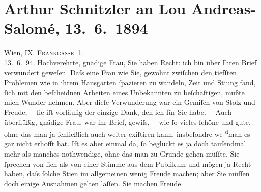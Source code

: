 

         
         \renewcommand{\erwaehntePersonen}{Personen: Lou Andreas-Salomé, Georg Brandes, Paul Goldmann}
         \renewcommand{\erwaehnteOrte}{Orte: Frankgasse 1, Paris, Wien}
         \renewcommand{\erwaehnteWerke}{Werke: Anatol, Das Märchen. Schauspiel in drei Aufzügen}
               \section[Arthur Schnitzler an Lou Andreas-Salomé, 13. 6. 1894]{ Arthur Schnitzler an Lou Andreas-Salomé, 13. 6. 1894}\nopagebreak{}\rehead{ }\begin{ledgroupsized}[t]{13cm}\normalsize\beginnumbering{} \toendnotes[C]{\smallbreak\pagebreak[2]} 
\toendnotes[C]{\smallbreak}\pstart
           \raggedleft{}{\pb}Wien, IX. \textsc{Frankgasse 1}.{\\}13. 6. 94.\pend
           \pstart{}Hochverehrte, gnädige Frau,\pend\pstart
           Sie haben Recht: ich bin über Ihren Brief verwundert geweſen. Daſs eine Frau wie Sie,
               gewohnt zwiſchen den tiefſten Problemen wie in ihrem Hausgarten ſpazieren zu wandeln,
               Zeit und Sti{\geminationm}ung fand, ſich mit den beſcheidnen Arbeiten
               eines Unbekannten zu beſchäftigen, mußte mich Wunder nehmen. Aber dieſe Verwunderung
                  {\pb}war ein Gemiſch von Stolz und Freude; – ſie iſt vorläufig der einzige
               Dank, den ich für Sie habe. – Auch überflüßig, gnädige Frau, war ihr Brief, gewiſs, –
               wie ſo vieles ſchöne und gute, ohne das man ja ſchließlich auch weiter exiſtiren
               kann, insbeſondre we{\geminationn}{ }\substVorne{}\textsuperscript{d}\substDazwischen{}m\substHinten{}an es gar nicht erhofft hat. Iſt es aber einmal da, ſo beglückt es ja doch
               tauſendmal mehr als manches noth{\pb}wendige, ohne das man zu Grunde gehen
               müſſte. Sie ſprechen von ſich als von einer Stimme aus dem Publikum und mögen ja
               Recht haben, daſs ſolche Sti{\geminationm}en im allgemeinen wenig
               Freude machen; aber Sie müſſen doch einige Ausnahmen gelten laſſen. Sie machen Freude

\end{ledgroupsized}
